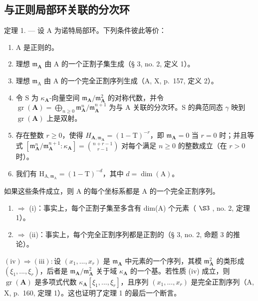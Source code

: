 \subsection{与正则局部环关联的分次环}

定理 1. --- 设 A 为诺特局部环。下列条件彼此等价：

\begin{enumerate}
\def\labelenumi{(\roman{enumi})}
\item
  A 是正则的。
\item
  理想 \(\mathfrak{m}_{\mathbf{A}}\) 由 A 的一个正割子集生成（§ 3, no. 2, 定义 1）。
\item
  理想 \(\mathfrak{m}_{\mathrm{A}}\) 由 A 的一个完全正割序列生成（A, X, p.~157, 定义 2）。
\item
  令 S 为 \(\kappa_{\mathbf{A}}\)-向量空间 \(\mathfrak{m}_{\mathbf{A}} / \mathfrak{m}_{\mathbf{A}}^{2}\) 的对称代数，并令 \(\operatorname{gr}(\mathbf{A}) = \bigoplus_{n \geqslant 0} \mathfrak{m}_{\mathbf{A}}^{n} / \mathfrak{m}_{\mathbf{A}}^{n+1}\) 为与 A 关联的分次环。S 的典范同态 \(\gamma\) 映到 \(\operatorname{gr}(\mathbf{A})\) 上是双射。
\item
  存在整数 \(r \geqslant 0\)，使得 \(H_{\mathbf{A},\mathfrak{m}_{\mathbf{A}}} = (1 - \mathrm{T})^{-r}\)，即 \(\mathfrak{m}_{\mathbf{A}} = 0\) 当 \(r = 0\) 时；并且等式 \([\mathfrak{m}_{\mathbf{A}}^{n}/\mathfrak{m}_{\mathbf{A}}^{n+1}:\kappa_{\mathbf{A}}] = \binom{n + r - 1}{r - 1}\) 对每个满足 \(n \geqslant 0\) 的整数成立（在 \(r > 0\) 时）。
\item
  我们有 \(\mathrm{H}_{\mathrm{A},\mathfrak{m}_{\mathrm{A}}} = (1 - \mathrm{T})^{-d}\)，其中 \(d = \dim (\mathrm{A})\)。
\end{enumerate}

如果这些条件成立，则 A 的每个坐标系都是 A 的一个完全正割序列。

\begin{enumerate}
\def\labelenumi{(\roman{enumi})}
\setcounter{enumi}{1}
\item
  \(\Rightarrow\) (i)：事实上，每个正割子集至多含有 dim(A) 个元素（ \(\S 3\) , no. 2, 定理 1）。
\item
  \(\Rightarrow\) (ii)：事实上，每个完全正割序列都是正割的（§ 3, no. 2, 命题 3 的推论）。
\end{enumerate}

\((\mathrm{iv}) \Rightarrow (\mathrm{iii}) : \text{设 } (x_1, ..., x_r)\) 是 \(\mathfrak{m}_{\mathbf{A}}\) 中元素的一个序列，其模 \(\mathfrak{m}_{\mathbf{A}}^2\) 的类形成 \((\xi_1, ..., \xi_r)\)，后者是 \(\mathfrak{m}_{\mathbf{A}} / \mathfrak{m}_{\mathbf{A}}^2\) 关于域 \(\kappa_{\mathbf{A}}\) 的一个基。若性质 (iv) 成立，则 \(\operatorname{gr}(\mathbf{A})\) 是多项式代数 \(\kappa_{\mathbf{A}}[\xi_1, ..., \xi_r]\)，且序列 \((x_1, ..., x_r)\) 是完全正割序列（A, X, p.~160, 定理 1）。这也证明了定理 1 的最后一个断言。

